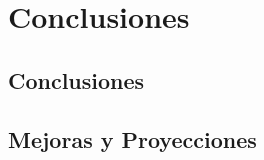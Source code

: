 \chapter{Conclusiones}
\label{chap:conclusion}


\section{Conclusiones}
\label{conclusion:webb}


\section{Mejoras y Proyecciones}
\label{conclusion:futuro}

